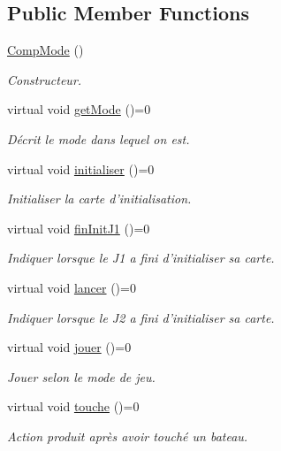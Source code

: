 \subsection*{Public Member Functions}
\begin{DoxyCompactItemize}
\item 
\hyperlink{classCompMode_aab4f503377e812cd05e2f1914c2faae3}{Comp\+Mode} ()
\begin{DoxyCompactList}\small\item\em Constructeur. \end{DoxyCompactList}\item 
virtual void \hyperlink{classCompMode_a897f6f474d86453c91ab83ab61c6f031}{get\+Mode} ()=0
\begin{DoxyCompactList}\small\item\em Décrit le mode dans lequel on est. \end{DoxyCompactList}\item 
virtual void \hyperlink{classCompMode_a3559cd952b7f3c6f8e7f22f6f3dc23ae}{initialiser} ()=0
\begin{DoxyCompactList}\small\item\em Initialiser la carte d'initialisation. \end{DoxyCompactList}\item 
virtual void \hyperlink{classCompMode_a1e3c25af2e4e655d8ab55b77854069d7}{fin\+Init\+J1} ()=0
\begin{DoxyCompactList}\small\item\em Indiquer lorsque le J1 a fini d'initialiser sa carte. \end{DoxyCompactList}\item 
virtual void \hyperlink{classCompMode_a311cf95ec88795dfb14dbed569a7d54f}{lancer} ()=0
\begin{DoxyCompactList}\small\item\em Indiquer lorsque le J2 a fini d'initialiser sa carte. \end{DoxyCompactList}\item 
virtual void \hyperlink{classCompMode_a81615504b7d72e0255b7fc09a991e0b5}{jouer} ()=0
\begin{DoxyCompactList}\small\item\em Jouer selon le mode de jeu. \end{DoxyCompactList}\item 
virtual void \hyperlink{classCompMode_a6b26d4c754fe0cc104d24d79f472b24d}{touche} ()=0
\begin{DoxyCompactList}\small\item\em Action produit après avoir touché un bateau. \end{DoxyCompactList}\item 

\end{DoxyCompactItemize}

